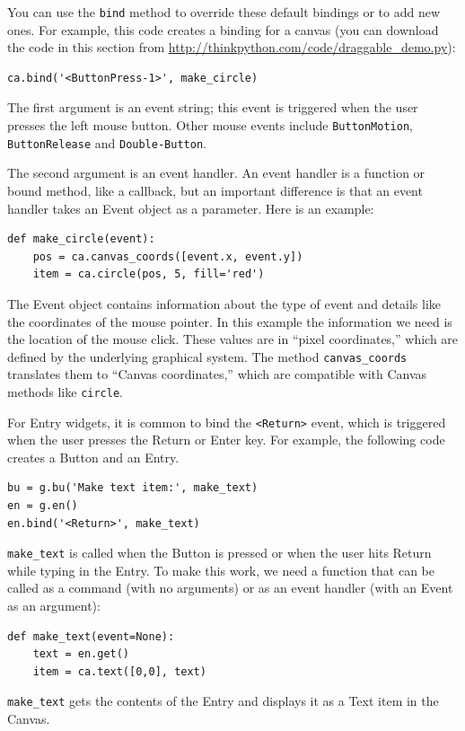 \documentclass[10pt]{book}
\begin{document}
You can use the {\tt bind} method to override these default
bindings or to add new ones.  For example, this code creates a
binding for a canvas (you can download the code in this
section from \url{http://thinkpython.com/code/draggable_demo.py}):

\begin{verbatim}
ca.bind('<ButtonPress-1>', make_circle)
\end{verbatim}
%
The first argument is an event string; this event is triggered
when the user presses the left mouse button.  Other mouse
events include {\tt ButtonMotion}, {\tt ButtonRelease} and
{\tt Double-Button}.

The second argument is an event handler.  An event handler
is a function or bound method, like a callback, but an important
difference is that an event handler takes an Event object as a
parameter.  Here is an example:

\begin{verbatim}
def make_circle(event):
    pos = ca.canvas_coords([event.x, event.y])
    item = ca.circle(pos, 5, fill='red')
\end{verbatim}
%
The Event object contains information about the type of event and
details like the coordinates of the mouse pointer.  In this example
the information we need is
the location of the mouse click.  These
values are in ``pixel coordinates,'' which are defined by the
underlying graphical system.  The method \verb"canvas_coords"
translates them to ``Canvas coordinates,'' which are compatible with
Canvas methods like {\tt circle}.

For Entry widgets, it is common to bind the \verb"<Return>" event,
which is triggered when the user presses the {\sf Return} or
{\sf Enter} key.  For example, the following code creates a Button
and an Entry.

\begin{verbatim}
bu = g.bu('Make text item:', make_text)
en = g.en()
en.bind('<Return>', make_text)
\end{verbatim}
%
\verb"make_text" is called when the Button is pressed or when
the user hits {\sf Return} while typing in the Entry.  To make
this work, we need a function that can be called as a command
(with no arguments) or as an event handler (with an Event
as an argument):

\begin{verbatim}
def make_text(event=None):
    text = en.get()
    item = ca.text([0,0], text)
\end{verbatim}
%
\verb"make_text" gets the contents of the Entry and displays
it as a Text item in the Canvas.
\end{document}
